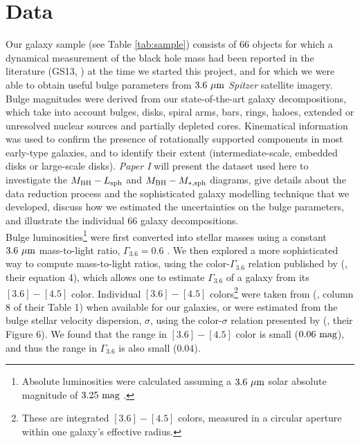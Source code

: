\documentclass[preprint2]{emulateapj}
\begin{document}
\section{Data}
\label{sec:data}
Our galaxy sample (see Table \ref{tab:sample}) 
consists of 66 objects for which a dynamical measurement of the black hole mass had been reported in the literature 
(GS13, \citealt{rusli2013bhmassesDM}) at the time we started this project, 
and for which we were able to obtain useful bulge parameters from $3.6\rm~\mu m$ \emph{Spitzer} satellite imagery. 
Bulge magnitudes were derived from our state-of-the-art galaxy decompositions, which take into account 
bulges, disks, spiral arms, bars, rings, haloes, extended or unresolved nuclear sources and partially depleted cores.
Kinematical information \citep{atlas3dIII-MNRAS,scott2014,arnold2014} was used 
to confirm the presence of rotationally supported components in most early-type galaxies, 
and to identify their extent (intermediate-scale, embedded disks or large-scale disks). 
\emph{Paper I} will present the dataset used here to investigate the $M_{\rm BH} - L_{\rm sph}$ and $M_{\rm BH} - M_{\rm *,sph}$ diagrams, 
give details about the data reduction process and the sophisticated galaxy modelling technique that we developed, 
discuss how we estimated the uncertainties on the bulge parameters, 
and illustrate the individual 66 galaxy decompositions. \\
Bulge luminosities\footnote{Absolute luminosities were calculated 
assuming a $3.6\rm~\mu m$ solar absolute magnitude of $3.25\rm~mag$ \citep{sani2011}.} 
were first converted into stellar masses using a constant $3.6\rm~\mu m$ mass-to-light ratio, $\Gamma_{3.6} = 0.6$ \citep{meidt2014}.
We then explored a more sophisticated way to compute mass-to-light ratios, 
using the color-$\Gamma_{3.6}$ relation published by 
\citeauthor{meidt2014} (\citeyear{meidt2014}, their equation 4), 
which allows one to estimate $\Gamma_{3.6}$ of a galaxy from its $[3.6] - [4.5]$ color. 
Individual $[3.6] - [4.5]$ colors\footnote{These are integrated $[3.6] - [4.5]$ colors, measured in a circular aperture 
within one galaxy's effective radius.} were taken from 
\citeauthor{peletier2012} (\citeyear{peletier2012}, column 8 of their Table 1) 
when available for our galaxies, 
or were estimated from the bulge stellar velocity dispersion, $\sigma$, 
using the color-$\sigma$ relation presented by \citeauthor{peletier2012} (\citeyear{peletier2012}, their Figure 6).
We found that the range in $[3.6] - [4.5]$ color is small ($0.06\rm~mag$), 
and thus the range in $\Gamma_{3.6}$ is also small ($0.04$).
\end{document}
